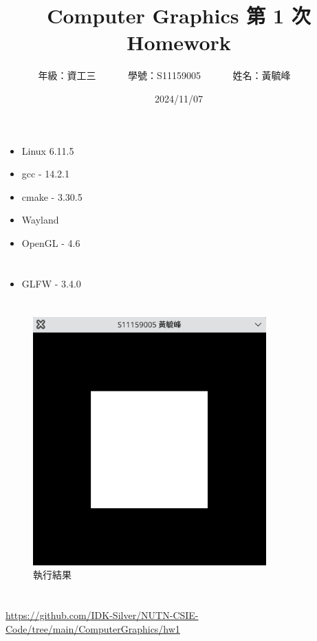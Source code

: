 \documentclass[12pt,a4paper]{article}
\begin{document}
\title{
  {
    \heiti Computer Graphics 第 1 次 Homework
  }
}


\date{2024/11/07}
\author{
  年級：{資工三}~~~~~~
  學號：{S11159005}~~~~~~
  姓名：{黃毓峰}~~~~~~
}

\maketitle
\newlength{\question}
\settowidth{\question}{XX}

\section*{\heiti \color{black}{電腦軟體系統簡介}}

\begin{itemize}
  \item Linux 6.11.5
  \item gcc - 14.2.1
  \item cmake - 3.30.5
  \item Wayland
  \item OpenGL - 4.6 
\end{itemize}

\section*{\heiti \color{black}{GLFW函式庫名稱與版本}}

\begin{itemize}
  \item GLFW - 3.4.0
\end{itemize}
\newpage
\section*{\heiti \color{black}{編譯後的執行成果}}
\begin{figure}[h]
  \centering
  \includegraphics[width=0.8\textwidth]{img/hw1_result.png}
  \caption{執行結果}
\end{figure}


\section*{\heiti \color{black}{SourceCode}}
\sloppy
\noindent \url{https://github.com/IDK-Silver/NUTN-CSIE-Code/tree/main/ComputerGraphics/hw1}
\end{document}

